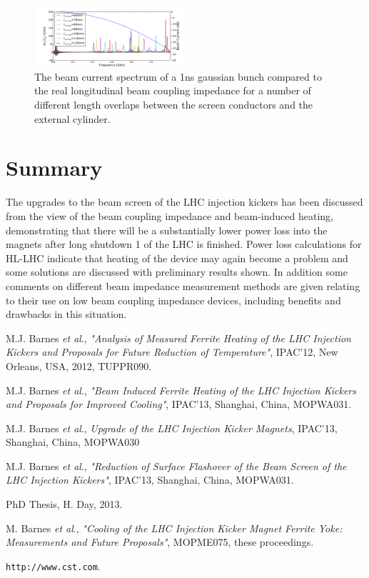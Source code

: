 \documentclass[a4paper,
              ]{jacow}
\begin{document}
\begin{figure}
\includegraphics[width=0.5\textwidth]{overlapSpec.pdf}
\caption{The beam current spectrum of a 1ns gaussian bunch compared to the real longitudinal beam coupling impedance for a number of different length overlaps between the screen conductors and the external cylinder.}
\label{fig:overLapSpec}
\end{figure}

\section{Summary}

The upgrades to the beam screen of the LHC injection kickers has been discussed from the view of the beam coupling impedance and beam-induced heating, demonstrating that there will be a substantially lower power loss into the magnets after long shutdown 1 of the LHC is finished. Power loss calculations for HL-LHC indicate that heating of the device may again become a problem and some solutions are discussed with preliminary results shown. In addition some comments on different beam impedance measurement methods are given relating to their use on low beam coupling impedance devices, including benefits and drawbacks in this situation.



\begin{thebibliography}{9}

M.J. Barnes \emph{et al}., \emph{"Analysis of Measured Ferrite Heating of the LHC Injection Kickers and Proposals for Future Reduction of Temperature"}, IPAC'12, New Orleans, USA, 2012, TUPPR090.

M.J. Barnes \emph{et al}., \emph{"Beam Induced Ferrite Heating of the LHC Injection Kickers and Proposals for Improved Cooling"}, IPAC'13, Shanghai, China, MOPWA031.

M.J. Barnes \emph{et al}., \emph{Upgrade of the LHC Injection Kicker Magnets}, IPAC'13, Shanghai, China, MOPWA030

M.J. Barnes \emph{et al}., \emph{"Reduction of Surface Flashover of the Beam Screen of the LHC Injection Kickers"}, IPAC'13, Shanghai, China, MOPWA031.

PhD Thesis, H. Day, 2013.

M. Barnes \emph{et al}., \emph{"Cooling of the LHC Injection Kicker Magnet Ferrite Yoke: Measurements and Future Proposals"}, MOPME075, these proceedings.

\texttt{http://www.cst.com}.

\end{thebibliography}
\end{document}
